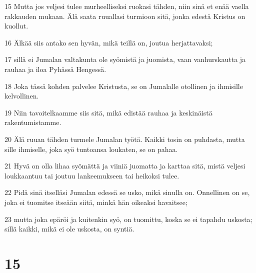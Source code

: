 \par 15 Mutta jos veljesi tulee murheelliseksi ruokasi tähden, niin sinä et enää vaella rakkauden mukaan. Älä saata ruuallasi turmioon sitä, jonka edestä Kristus on kuollut.
\par 16 Älkää siis antako sen hyvän, mikä teillä on, joutua herjattavaksi;
\par 17 sillä ei Jumalan valtakunta ole syömistä ja juomista, vaan vanhurskautta ja rauhaa ja iloa Pyhässä Hengessä.
\par 18 Joka tässä kohden palvelee Kristusta, se on Jumalalle otollinen ja ihmisille kelvollinen.
\par 19 Niin tavoitelkaamme siis sitä, mikä edistää rauhaa ja keskinäistä rakentumistamme.
\par 20 Älä ruuan tähden turmele Jumalan työtä. Kaikki tosin on puhdasta, mutta sille ihmiselle, joka syö tuntoansa loukaten, se on pahaa.
\par 21 Hyvä on olla lihaa syömättä ja viiniä juomatta ja karttaa sitä, mistä veljesi loukkaantuu tai joutuu lankeemukseen tai heikoksi tulee.
\par 22 Pidä sinä itselläsi Jumalan edessä se usko, mikä sinulla on. Onnellinen on se, joka ei tuomitse itseään siitä, minkä hän oikeaksi havaitsee;
\par 23 mutta joka epäröi ja kuitenkin syö, on tuomittu, koska se ei tapahdu uskosta; sillä kaikki, mikä ei ole uskosta, on syntiä.

\chapter{15}

